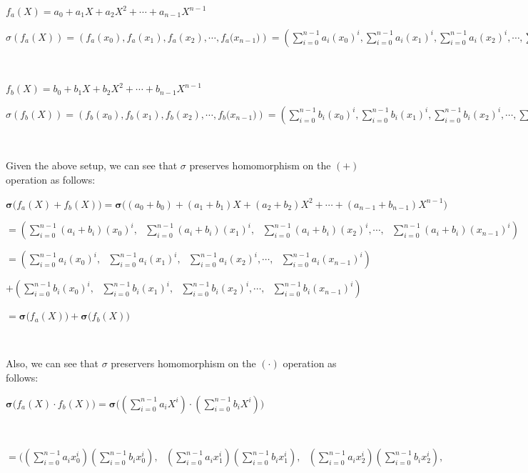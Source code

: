 $f_a(X) = a_0 + a_1X + a_2X^2 + \cdots + a_{n-1}X^{n-1}$

$ \sigma(f_a(X)) = \left({f_a(x_0)}, {f_a(x_1)}, {f_a(x_2)}, \cdots, {f_a(x_{n-1}}) \right)  = \left(\sum\limits_{i=0}^{n-1}a_i(x_0)^i, \sum\limits_{i=0}^{n-1}a_i(x_1)^i, \sum\limits_{i=0}^{n-1}a_i(x_2)^i, \cdots, \sum\limits_{i=0}^{n-1}a_i(x_{n-1})^i\right)$


$ $

$f_b(X) = b_0 + b_1X + b_2X^2 + \cdots + b_{n-1}X^{n-1}$

$ \sigma(f_b(X)) = \left({f_b(x_0)}, {f_b(x_1)}, {f_b(x_2)}, \cdots, {f_b(x_{n-1}}) \right) = \left(\sum\limits_{i=0}^{n-1}b_i(x_0)^i, \sum\limits_{i=0}^{n-1}b_i(x_1)^i, \sum\limits_{i=0}^{n-1}b_i(x_2)^i, \cdots, \sum\limits_{i=0}^{n-1}b_i(x_{n-1})^i\right)$

$ $

Given the above setup, we can see that $\sigma$ preserves homomorphism on the $(+)$ operation as follows:

$\bm{\sigma}\bm{(}f_a(X) + f_b(X)\bm{)} = \bm{\sigma\bigg(}(a_0 + b_0) + (a_1 + b_1)X + (a_2 + b_2)X^2 + \cdots + (a_{n-1} + b_{n-1})X^{n-1}\bm{\bigg)}$

$= \left(\sum\limits_{i=0}^{n-1}(a_i + b_i)(x_0)^i, \text{ }\sum\limits_{i=0}^{n-1}(a_i + b_i)(x_1)^i, \text{ }\sum\limits_{i=0}^{n-1}(a_i + b_i)(x_2)^i, \cdots, \text{ }\sum\limits_{i=0}^{n-1}(a_i + b_i)(x_{n-1})^i\right)$

$= \left(\sum\limits_{i=0}^{n-1}a_i(x_0)^i, \text{ }\sum\limits_{i=0}^{n-1}a_i(x_1)^i, \text{ }\sum\limits_{i=0}^{n-1}a_i(x_2)^i, \cdots, \text{ } \sum\limits_{i=0}^{n-1}a_i(x_{n-1})^i\right)$

\text{ } $+ \left(\sum\limits_{i=0}^{n-1}b_i(x_0)^i, \text{ } \sum\limits_{i=0}^{n-1}b_i(x_1)^i, \text{ } \sum\limits_{i=0}^{n-1}b_i(x_2)^i, \cdots, \text{ } \sum\limits_{i=0}^{n-1}b_i(x_{n-1})^i\right)$

$= \bm{\sigma(}f_a(X)\bm{)} + \bm{\sigma(}f_b(X)\bm{)}$

$ $

Also, we can see that $\sigma$ preservers homomorphism on the $(\cdot)$ operation as follows:


$\bm{\sigma(}f_a(X)\cdot f_b(X)\bm{)} = \bm{\sigma\bigg(}\left(\sum\limits_{i=0}^{n-1}a_iX^i\right)\cdot\left( \sum\limits_{i=0}^{n-1}b_iX^i\right)\bm{\bigg)}$

$ $

$= \Bigg( \left(\sum\limits_{i=0}^{n-1}a_ix_0^i\right)\left( \sum\limits_{i=0}^{n-1}b_ix_0^i\right), \text{ }
\left(\sum\limits_{i=0}^{n-1}a_ix_1^i\right)\left( \sum\limits_{i=0}^{n-1}b_ix_1^i\right), \text{ }
\left(\sum\limits_{i=0}^{n-1}a_ix_2^i\right)\left( \sum\limits_{i=0}^{n-1}b_ix_2^i\right),$

